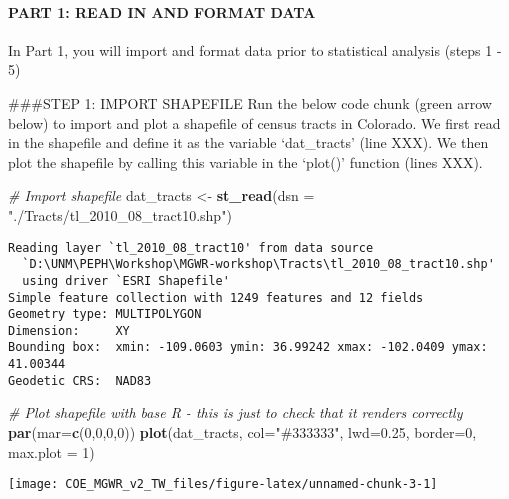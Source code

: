 \documentclass[
  12pt,
]{article}
\newenvironment{Shaded}{\begin{snugshade}}{\end{snugshade}}
\newcommand{\AttributeTok}[1]{\textcolor[rgb]{0.13,0.29,0.53}{#1}}
\newcommand{\CommentTok}[1]{\textcolor[rgb]{0.56,0.35,0.01}{\textit{#1}}}
\newcommand{\DecValTok}[1]{\textcolor[rgb]{0.00,0.00,0.81}{#1}}
\newcommand{\FloatTok}[1]{\textcolor[rgb]{0.00,0.00,0.81}{#1}}
\newcommand{\FunctionTok}[1]{\textcolor[rgb]{0.13,0.29,0.53}{\textbf{#1}}}
\newcommand{\NormalTok}[1]{#1}
\newcommand{\OtherTok}[1]{\textcolor[rgb]{0.56,0.35,0.01}{#1}}
\newcommand{\StringTok}[1]{\textcolor[rgb]{0.31,0.60,0.02}{#1}}
\begin{document}
\hypertarget{part-1-read-in-and-format-data}{%
\paragraph{PART 1: READ IN AND FORMAT
DATA}\label{part-1-read-in-and-format-data}}

In Part 1, you will import and format data prior to statistical analysis
(steps 1 - 5)

\#\#\#STEP 1: IMPORT SHAPEFILE Run the below code chunk (green arrow
below) to import and plot a shapefile of census tracts in Colorado. We
first read in the shapefile and define it as the variable `dat\_tracts'
(line XXX). We then plot the shapefile by calling this variable in the
`plot()' function (lines XXX).

\begin{Shaded}
\begin{Highlighting}[]
\CommentTok{\# Import shapefile}
\NormalTok{dat\_tracts }\OtherTok{\textless{}{-}} \FunctionTok{st\_read}\NormalTok{(}\AttributeTok{dsn =} \StringTok{"./Tracts/tl\_2010\_08\_tract10.shp"}\NormalTok{)}
\end{Highlighting}
\end{Shaded}

\begin{verbatim}
Reading layer `tl_2010_08_tract10' from data source 
  `D:\UNM\PEPH\Workshop\MGWR-workshop\Tracts\tl_2010_08_tract10.shp' 
  using driver `ESRI Shapefile'
Simple feature collection with 1249 features and 12 fields
Geometry type: MULTIPOLYGON
Dimension:     XY
Bounding box:  xmin: -109.0603 ymin: 36.99242 xmax: -102.0409 ymax: 41.00344
Geodetic CRS:  NAD83
\end{verbatim}

\begin{Shaded}
\begin{Highlighting}[]
\CommentTok{\# Plot shapefile with base R {-} this is just to check that it renders correctly}
\FunctionTok{par}\NormalTok{(}\AttributeTok{mar=}\FunctionTok{c}\NormalTok{(}\DecValTok{0}\NormalTok{,}\DecValTok{0}\NormalTok{,}\DecValTok{0}\NormalTok{,}\DecValTok{0}\NormalTok{))}
\FunctionTok{plot}\NormalTok{(dat\_tracts, }\AttributeTok{col=}\StringTok{"\#333333"}\NormalTok{, }\AttributeTok{lwd=}\FloatTok{0.25}\NormalTok{, }\AttributeTok{border=}\DecValTok{0}\NormalTok{, }\AttributeTok{max.plot =} \DecValTok{1}\NormalTok{)}
\end{Highlighting}
\end{Shaded}

\begin{center}\texttt{[image: COE\_MGWR\_v2\_TW\_files/figure-latex/unnamed-chunk-3-1]} \end{center}
\end{document}
